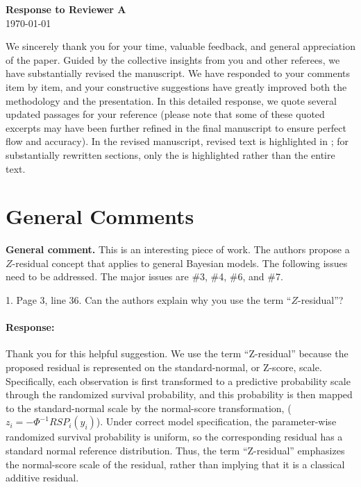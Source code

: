\documentclass[11pt]{article}
\newcommand*{\mybox}[2]{\colorbox{#1!30}{\parbox{.98\linewidth}{#2}}}
\begin{document}
\begin{center}
    {\LARGE \textbf{Response to Reviewer A}} \\[1em]
    {\large \today}
\end{center}
\vspace{2em} %
\normalsize
\normalsize

We sincerely thank you for your time, valuable feedback, and general appreciation of the paper. Guided by the collective insights from you and other referees, we have substantially revised the manuscript. We have responded to your comments item by item, and your constructive suggestions have greatly improved both the methodology and the presentation. In this detailed response, we quote several updated passages for your reference (please note that some of these quoted excerpts may have been further refined in the final manuscript to ensure perfect flow and accuracy). In the revised manuscript, revised text is highlighted in ; for substantially rewritten sections, only the  is highlighted rather than the entire text. 

\section*{General Comments}

\mybox{gray}{\textbf{General comment.} This is an interesting piece of work. The authors propose a $Z$-residual concept that applies to general Bayesian models. The following issues need to be addressed. The major issues are \#3, \#4, \#6, and \#7.}

\medskip

\mybox{gray}{1. Page 3, line 36. Can the authors explain why you use the term ``$Z$-residual''?}

\paragraph{Response:}
Thank you for this helpful suggestion. We use the term “Z-residual” because the proposed residual is represented on the standard-normal, or Z-score, scale. Specifically, each observation is first transformed to a predictive probability scale through the randomized survival probability, and this probability is then mapped to the standard-normal scale by the normal-score transformation, ($z_i=-\Phi^{-1}{RSP_i(y_i)}$).
Under correct model specification, the parameter-wise randomized survival probability is uniform, so the corresponding residual has a standard normal reference distribution. Thus, the term “Z-residual” emphasizes the normal-score scale of the residual, rather than implying that it is a classical additive residual. 
\end{document}
